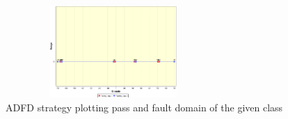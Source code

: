 \documentclass[runningheads,a4paper]{llncs}
\begin{document}
\begin{figure}[ht]
\centering
\includegraphics[width=8.2cm,height=3.5cm]{pointDomainOneArgument.png}
\caption{ADFD strategy plotting pass and fault domain of the given class}
\label{fig:ADFD-example}
\end{figure}

\end{document}
